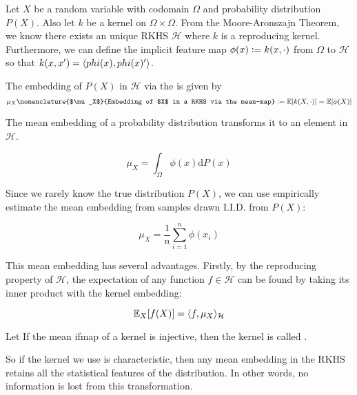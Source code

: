 Let $X$ be a random variable with codomain $\Omega$ and probability distribution $P(X)$. Also let $k$ be a kernel on $\Omega \times \Omega$. From the Moore-Aronszajn Theorem, we know there exists an unique RKHS $\mathcal{H}$ where $k$ is a reproducing kernel. Furthermore, we can define the implicit feature map $\phi(x) \vcentcolon= k(x, \cdot)$ from $\Omega$ to $\mathcal{H}$ so that $k(x, x^\prime) = \langle phi(x), phi(x)^\prime\rangle$.

\begin{definition}
The embedding of $P(X)$ in $\mathcal{H}$ via the  is given by
\begin{equation}
  \mu_{X}\nomenclature{$\mu_X$}{Embedding of $X$ in a RKHS via the mean-map} \defeq \E[k(X, \cdot)] = \E[\phi(X)]
\end{equation}
\end{definition}

The mean embedding of a probability distribution transforms it to an element in $\mathcal{H}$.

\begin{equation}
  \mu_{X} = \int_\Omega \phi(x) \mathrm{d}P(x)
\end{equation}

Since we rarely know the true distribution $P(X)$, we can use empirically estimate the mean embedding from samples drawn I.I.D. from $P(X)$:

\begin{equation}
\mu_{X} = \frac{1}{n} \sum_{i=1}^n \phi(x_i)
\end{equation}

This mean embedding has several advantages. Firstly, by the reproducing property of $\mathcal{H}$, the expectation of any function $f \in \mathcal{H}$ can be found by taking its inner product with the kernel embedding:

\begin{equation}
\mathbb{E}_X[f(X)] = \langle f, \mu_X\rangle_\mathcal{H}
\end{equation}

\begin{definition}
  Let If the mean ifmap of a kernel is injective, then the kernel is called .
\end{definition}

So if the kernel we use is characteristic, then any mean embedding in the RKHS retains all the statistical features of the distribution. In other words, no information is lost from this transformation.

